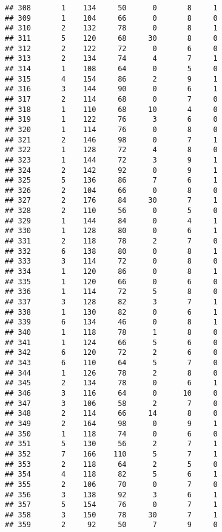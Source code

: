 \documentclass[
]{article}
\begin{document}
\begin{verbatim}
## 308       1    134     50      0       8     1
## 309       1    104     66      0       8     0
## 310       2    132     78      0       8     1
## 311       5    120     68     30       8     0
## 312       2    122     72      0       6     0
## 313       2    134     74      4       7     1
## 314       1    108     64      0       5     0
## 315       4    154     86      2       9     1
## 316       3    144     90      0       6     1
## 317       2    114     68      0       7     0
## 318       1    110     68     10       4     0
## 319       1    122     76      3       6     0
## 320       1    114     76      0       8     0
## 321       2    146     98      0       7     1
## 322       1    128     72      4       8     0
## 323       1    144     72      3       9     1
## 324       2    142     92      0       9     1
## 325       5    136     86      7       6     1
## 326       2    104     66      0       8     0
## 327       2    176     84     30       7     1
## 328       2    110     56      0       5     0
## 329       1    144     84      0       4     1
## 330       1    128     80      0       6     1
## 331       2    118     78      2       7     0
## 332       6    138     80      0       8     1
## 333       3    114     72      0       8     0
## 334       1    120     86      0       8     1
## 335       1    120     66      0       6     0
## 336       1    114     72      5       8     0
## 337       3    128     82      3       7     1
## 338       1    130     82      0       6     1
## 339       6    134     46      0       8     1
## 340       1    118     78      1       8     0
## 341       1    124     66      5       6     0
## 342       6    120     72      2       6     0
## 343       6    110     64      5       7     0
## 344       1    126     78      2       8     0
## 345       2    134     78      0       6     1
## 346       3    116     64      0      10     0
## 347       3    106     58      2       7     0
## 348       2    114     66     14       8     0
## 349       2    164     98      0       9     1
## 350       1    118     74      0       6     0
## 351       5    130     56      2       7     1
## 352       7    166    110      5       7     1
## 353       2    118     64      2       5     0
## 354       4    118     82      5       6     1
## 355       2    106     70      0       7     0
## 356       3    138     92      3       6     1
## 357       5    154     76      0       7     1
## 358       3    150     78     30       7     1
## 359       2     92     50      7       9     0

\end{verbatim}
\end{document}
